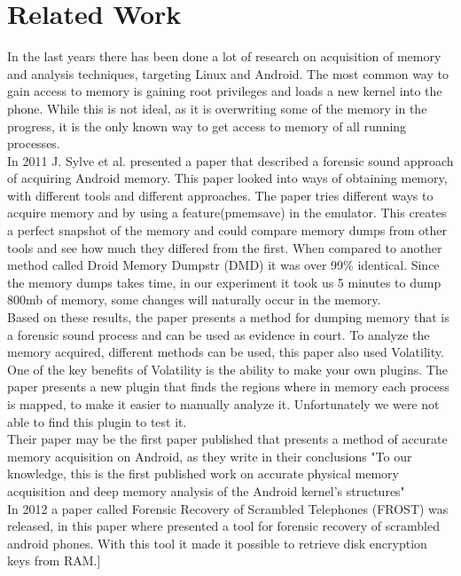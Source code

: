 \section{Related Work}
In the last years there has been done a lot of research on acquisition of memory
and analysis techniques, targeting Linux and Android. The most common way to 
gain access to memory is gaining root privileges and loads a new kernel into the 
phone. While this is not ideal, as it is overwriting some of the memory in the 
progress, it is the only known way to get access to memory of all running processes.\\

In 2011 J. Sylve et al. presented a paper that described a forensic sound 
approach of acquiring Android memory. \cite{acq_vol_android_mem} This paper looked 
into ways of obtaining memory, with different tools and different approaches. The paper 
tries different ways to acquire memory and by using a feature(pmemsave) in the emulator. 
This creates a perfect snapshot of the memory and could compare memory dumps from other 
tools and see how much they differed from the first. When compared to another method 
called Droid Memory Dumpstr (DMD) it was over 99\% identical. Since the memory dumps 
takes time, in our experiment it took us 5 minutes to dump 800mb of memory, some 
changes will naturally occur in the memory.\\

Based on these results, the paper presents a method for dumping memory that is a 
forensic sound process and can be used as evidence in court. To analyze the memory 
acquired, different methods can be used, this paper also used Volatility.
One of the key benefits of Volatility is the ability to make your 
own plugins. The paper presents a new plugin that finds the regions where in memory 
each process is mapped, to make it easier to manually analyze it. Unfortunately we were not 
able to find this plugin to test it.\\

Their paper may be the first paper published that presents a method of accurate memory acquisition on
Android, as they write in their conclusions "To our knowledge, this is the first published work on
accurate physical memory acquisition and deep memory analysis of the Android kernel's structures"\\

In 2012 a paper called Forensic Recovery of Scrambled Telephones (FROST) was 
released, in this paper where presented a tool for forensic recovery of scrambled 
android phones. With this tool it made it possible to retrieve disk encryption 
keys from RAM.\cite{frost_paper}]\\

